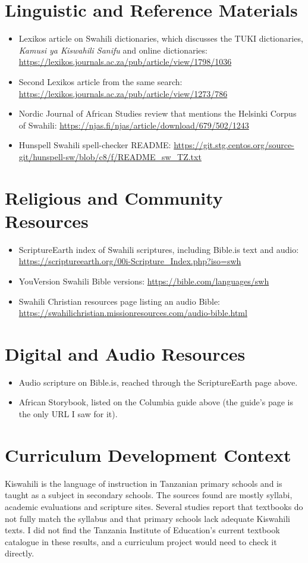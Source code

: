 \documentclass[12pt]{article}
\begin{document}
\section{Linguistic and Reference Materials}
\begin{itemize}
\item Lexikos article on Swahili dictionaries, which discusses the TUKI dictionaries, \textit{Kamusi ya Kiswahili Sanifu} and online dictionaries: \url{https://lexikos.journals.ac.za/pub/article/view/1798/1036}
\item Second Lexikos article from the same search: \url{https://lexikos.journals.ac.za/pub/article/view/1273/786}
\item Nordic Journal of African Studies review that mentions the Helsinki Corpus of Swahili: \url{https://njas.fi/njas/article/download/679/502/1243}
\item Hunspell Swahili spell-checker README: \url{https://git.stg.centos.org/source-git/hunspell-sw/blob/c8/f/README_sw_TZ.txt}
\end{itemize}

\section{Religious and Community Resources}
\begin{itemize}
\item ScriptureEarth index of Swahili scriptures, including Bible.is text and audio: \url{https://scriptureearth.org/00i-Scripture_Index.php?iso=swh}
\item YouVersion Swahili Bible versions: \url{https://bible.com/languages/swh}
\item Swahili Christian resources page listing an audio Bible: \url{https://swahilichristian.missionresources.com/audio-bible.html}
\end{itemize}

\section{Digital and Audio Resources}
\begin{itemize}
\item Audio scripture on Bible.is, reached through the ScriptureEarth page above.
\item African Storybook, listed on the Columbia guide above (the guide's page is the only URL I saw for it).
\end{itemize}

\section{Curriculum Development Context}
Kiswahili is the language of instruction in Tanzanian primary schools and is taught as a subject in secondary schools. The sources found are mostly syllabi, academic evaluations and scripture sites. Several studies report that textbooks do not fully match the syllabus and that primary schools lack adequate Kiswahili texts. I did not find the Tanzania Institute of Education's current textbook catalogue in these results, and a curriculum project would need to check it directly.
\end{document}
